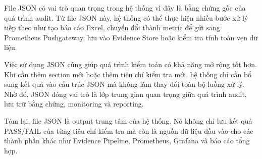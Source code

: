 File JSON có vai trò quan trọng trong hệ thống vì đây là bằng chứng gốc của quá trình audit. Từ file JSON này, hệ thống có thể thực hiện nhiều bước xử lý tiếp theo như tạo báo cáo Excel, chuyển đổi thành metric để gửi sang Prometheus Pushgateway, lưu vào Evidence Store hoặc kiểm tra tính toàn vẹn dữ liệu.

Việc sử dụng JSON cũng giúp quá trình kiểm toán có khả năng mở rộng tốt hơn. Khi cần thêm section mới hoặc thêm tiêu chí kiểm tra mới, hệ thống chỉ cần bổ sung kết quả vào cấu trúc JSON mà không làm thay đổi toàn bộ luồng xử lý. Nhờ đó, JSON đóng vai trò là lớp trung gian quan trọng giữa quá trình audit, lưu trữ bằng chứng, monitoring và reporting.

Tóm lại, file JSON là output trung tâm của hệ thống. Nó không chỉ lưu kết quả PASS/FAIL của từng tiêu chí kiểm tra mà còn là nguồn dữ liệu đầu vào cho các thành phần khác như Evidence Pipeline, Prometheus, Grafana và báo cáo tổng hợp.
